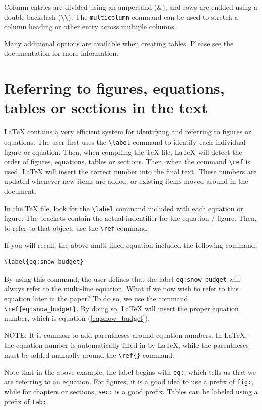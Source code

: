\documentclass[master]{UWMThesis}
\begin{document}
Column entries are divided using an ampersand (\&), and rows are endded using a double backslash (\verb=\\=).  The \verb=multicolumn= command can be used to stretch a column heading or other entry across multiple columns.

Many additional options are available when creating tables.  Please see the documentation for more information.


\chapter{Referring to figures, equations, tables or sections in the text}
LaTeX contains a very efficient system for identifying and referring to figures or equations.  The user first uses the  \verb=\label= command to identify each individual figure or equation.  Then, when compiling the TeX file, LaTeX will detect the order of figures, equations, tables or sections.  Then, when the command \verb=\ref= is used, LaTeX will insert the correct number into the final text.  These numbers are updated whenever new items are added, or existing items moved around in the document.

In the TeX file, look for the \verb=\label= command included with each equation or figure.
The brackets contain the actual indentifier for the equation / figure.  Then, to refer to that object, use the \verb=\ref= command.

If you will recall, the above multi-lined equation included the following command:

\begin{verbatim}
\label{eq:snow_budget}
\end{verbatim}

By using this command, the user defines that the label \verb=eq:snow_budget= will always refer to the multi-line equation.  What if we now wish to refer to this equation later in the paper?  To do so, we use the command \verb=\ref{eq:snow_budget}=.  By doing so, LaTeX will insert the proper equation number, which is equation (\ref{eq:snow_budget}).

NOTE: It is common to add parentheses around equation numbers.  In LaTeX, the equation number is automatically filled-in by LaTeX, while the parentheses must be added manually around the \verb=\ref{}= command.

Note that in the above example, the label begins with \verb=eq:=, which tells us that we are referring to an equation.  For figures, it is a good idea to use a prefix of \verb=fig:=, while for chapters or sections, \verb=sec:= is a good prefix.  Tables can be labeled using a prefix of \verb=tab:=.
\end{document}
